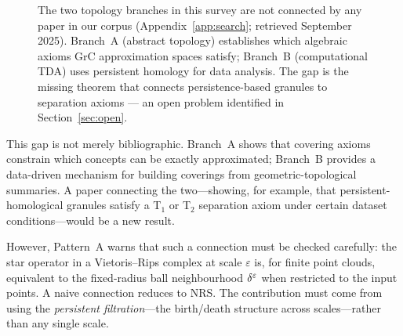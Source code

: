 \begin{figure}[pos=!htbp]
\caption{The two topology branches in this survey are not connected by any
paper in our corpus (Appendix~\ref{app:search}; retrieved September 2025).
Branch~A (abstract topology) establishes which algebraic
axioms GrC approximation spaces satisfy; Branch~B (computational TDA) uses
persistent homology for data analysis.  The gap is the missing theorem that
connects persistence-based granules to separation axioms --- an open problem
identified in Section~\ref{sec:open}.}
\label{fig:topo_gap}
\end{figure}

This gap is not merely bibliographic.  Branch~A shows that covering axioms
constrain which concepts can be exactly approximated; Branch~B provides a
data-driven mechanism for building coverings from geometric-topological
summaries.  A paper connecting the two---showing, for example, that
persistent-homological granules satisfy a T$_1$ or T$_2$ separation axiom
under certain dataset conditions---would be a new result.

However, Pattern~A warns that such a connection must be checked carefully:
the star operator in a Vietoris--Rips complex at scale $\varepsilon$ is,
for finite point clouds, equivalent to the fixed-radius ball neighbourhood
$\delta_{}^\varepsilon$ when restricted to the input points.  A naive connection
reduces to NRS.  The contribution must come from using the \emph{persistent
filtration}---the birth/death structure across scales---rather than any
single scale.

